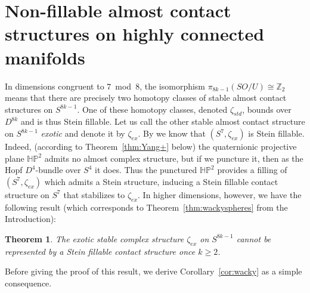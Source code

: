 \documentclass[12pt]{amsart}
\newcommand\Z{\mathbb{Z}}
\newcommand\scxs{\zeta}					%
\newcommand\Num{\textup{Num}}
\newtheorem{Theorem}{Theorem}[section]
\theoremstyle{remark}
\begin{document}
\section{Non{-}fillable almost contact structures on highly connected manifolds} 
\label{sec:nonst-acs}
In dimensions congruent to $7$~mod~$8$, the isomorphism
$\pi_{8k{-}1}(SO/U) \cong \Z_2$ means that there are precisely two homotopy classes of stable almost contact 
structures on $S^{8k{-}1}$.
One of these homotopy classes, denoted $\scxs_{std}$, bounds over $D^{8k}$ and is thus
Stein fillable.  Let us call the other stable almost contact
structure on $S^{8k{-}1}$ \emph{exotic} and denote it by
$\scxs_{ex}$.  By \cite[Theorem~1.3]{BCS2} we know that
$(S^7, \scxs_{ex})$ is Stein fillable.  Indeed, (according to
Theorem~\ref{thm:Yang+} below) the quaternionic projective plane ${\mathbb {HP}}^2$ 
admits no almost complex structure, but if we puncture it, then as the Hopf
$D^4$-bundle over $S^4$ it does. Thus the punctured ${\mathbb {HP}}^2$
provides a filling of $(S^7, \scxs_{ex})$ which admits a
Stein structure, inducing a Stein fillable contact structure on $S^7$
that stabilizes to $\zeta _{ex}$.  In higher dimensions, however, we have the following result (which 
corresponds to Theorem~\ref{thm:wackyspheres} from the Introduction):



\begin{Theorem}\label{thm:S8k{-}1}
The exotic stable complex structure $\zeta _{ex}$ on $S^{8k{-}1}$
cannot be represented by a Stein fillable contact structure once
$k\geq 2$.
\end{Theorem}
Before giving the proof of this result, we derive
Corollary~\ref{cor:wacky} as a simple consequence.
\end{document}
